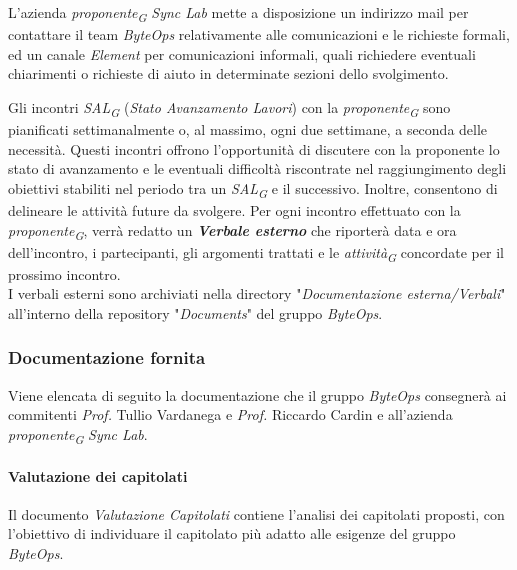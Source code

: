 \vspace{0.2cm}

L'azienda \textit{proponente}\textsubscript{\textit{G}} \textit{Sync Lab} mette a disposizione un indirizzo mail per contattare il team \textit{ByteOps} relativamente alle comunicazioni e le richieste formali, ed un canale \textit{Element} per comunicazioni informali, quali richiedere eventuali chiarimenti o richieste di aiuto in determinate sezioni dello svolgimento.

\vspace{0.2cm}

Gli incontri \textit{SAL}\textsubscript{\textit{G}} (\textit{Stato Avanzamento Lavori}) con la \textit{proponente}\textsubscript{\textit{G}} sono pianificati settimanalmente o, al massimo, ogni due settimane, a seconda delle necessità. Questi incontri offrono l'opportunità di discutere con la proponente lo stato di avanzamento e le eventuali difficoltà riscontrate nel raggiungimento degli obiettivi stabiliti nel periodo tra un \textit{SAL}\textsubscript{\textit{G}} e il successivo. Inoltre, consentono di delineare le attività future da svolgere.
Per ogni incontro effettuato con la \textit{proponente}\textsubscript{\textit{G}}, verrà redatto un \textit{\textbf{Verbale esterno}} che riporterà data e ora dell'incontro, i partecipanti, gli argomenti trattati e le \textit{attività}\textsubscript{\textit{G}} concordate per il prossimo incontro. \\
I verbali esterni sono archiviati nella directory "\textit{Documentazione esterna/Verbali}" all'interno della repository "\textit{Documents}" del gruppo \textit{ByteOps}.

\subsubsection {Documentazione fornita}
Viene elencata di seguito la documentazione che il gruppo \textit{ByteOps} consegnerà ai commitenti \textit{Prof.} Tullio Vardanega e \textit{Prof.} Riccardo Cardin e all'azienda \textit{proponente}\textsubscript{\textit{G}} \textit{Sync Lab}.

\paragraph{Valutazione dei capitolati}
Il documento \textit{Valutazione Capitolati} contiene l'analisi dei capitolati proposti, con l'obiettivo di individuare il capitolato più adatto alle esigenze del gruppo \textit{ByteOps}. 

